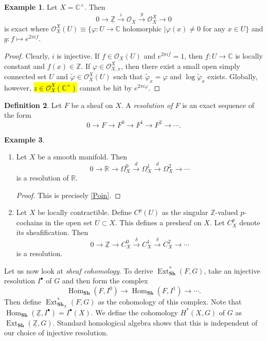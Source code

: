 \documentclass[10pt,letterpaper,cm]{nupset}
\theoremstyle{definition}
\newtheorem{definition}{Definition}[subsection]
\newtheorem{exmp}[definition]{Example}
\theoremstyle{theorem}
\theoremstyle{remark}
\newcommand{\C}{\mathbb C}
\newcommand{\R}{\mathbb{R}}
\newcommand{\Z}{\mathbb Z}
\newcommand{\1}{\mathbb{1}}
\newcommand{\0}{\vec 0}
\DeclareMathOperator{\ext}{Ext}
\DeclareMathOperator{\Hom}{Hom}
\begin{document}
\begin{exmp}
 Let $X = \C^{\times}$. Then $$ 0 \to \underline{\Z} \overset{i}{\longrightarrow} \mathcal{O}_X \overset{g}{\longrightarrow} \mathcal{O}_X^X \to 0$$ is exact where $\mathcal{O}_X^X(U) \equiv \{ \varphi : U \to \C$ holomorphic $\mid \varphi(x) \ne 0$ for any $x\in U\}$ and $g : f \mapsto e^{2\pi i f}$.
\end{exmp}
\begin{proof}
Clearly, $i$ is injective. If $f \in \mathcal{O}_X(U)$ and $e^{2\pi i f} =1$, then $f : U \to \C$ is locally constant and $f(x) \in \Z$. If $\varphi \in \mathcal{O}_{X,x}^X$, then there exist a small open simply connected set $U$ and $\tilde{\varphi} \in \mathcal{O}_X^X(U)$ such that $\tilde{\varphi}_x = \varphi$ and $\log{\tilde{\varphi}_x}$ exists. Globally, however, \hl{$z\in \mathcal{O}_X^X(\C^{\times})$} cannot be hit by $e^{2\pi i \varphi}$.
\end{proof}

\begin{definition}
Let $F$ be a sheaf on $X$. A \textit{resolution of $F$} is an exact sequence of the form $$0 \to F \to F^0 \to F^1 \to F^2 \to \cdots .$$
\end{definition}

\begin{exmp} $ $
\begin{enumerate}
\item Let $X$ be a smooth manifold. Then $$0 \to \R \to \Omega_X^0 \overset{d}{\longrightarrow} \Omega_X^1 \overset{d}{\longrightarrow} \Omega^2_X \to \cdots$$ is a resolution of $\R$.
\begin{proof}
This is precisely \cref{Poin}.
\end{proof}
\item Let $X$ be locally contractible. Define $C^p(U)$ as the singular $\Z$-valued $p$-cochains in the open set $U\subset X$. This defines a presheaf on $X$. Let $C^p_X$ denote its sheafification. Then $$0 \to \underline{\Z} \to C^0_X \overset{\delta}{\longrightarrow} C^1_X \overset{\delta}{\longrightarrow} C^2_X \to \cdots$$ is a resolution. 
\end{enumerate}
\end{exmp}

\medskip

Let us now look at \textit{sheaf cohomology}.
 To derive $\ext^{\ast}_{\mathbf{Sh}}(F, G)$, take an injective resolution $I^{\bullet}$ of $G$ and then form the complex $$\Hom_{\mathbf{Sh}}(F, I^0) \to \Hom_{\mathbf{Sh}}(F, I^1) \to \cdots.$$ Then define $\ext^{\ast}_{\mathbf{Sh}_{X}}(F, G)$ as the cohomology of this complex. Note that $\Hom_{\mathbf{Sh}}(\underline{\Z}, I^{\bullet}) = I^{\bullet}(X)$. We define the cohomology $H^{\ast}(X, G)$ of $G$ as $\ext_{\mathbf{Sh}}(\underline{\Z}, G)$.  Standard homological algebra shows that this is independent of our choice of injective resolution.  
\end{document}
